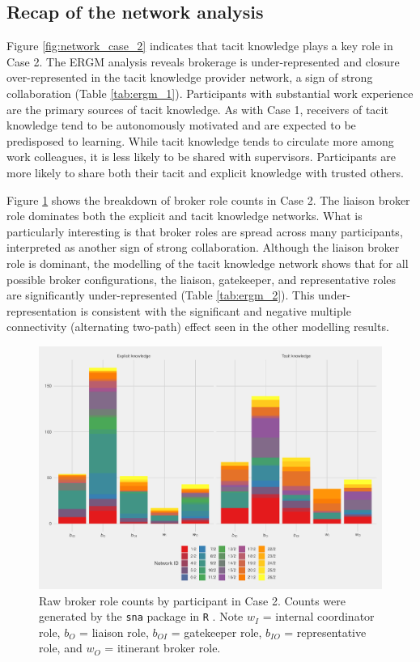 \subsection{Recap of the network analysis}

Figure \ref{fig:network_case_2} indicates that tacit knowledge plays a key role in Case 2. The ERGM analysis reveals brokerage is under-represented and closure over-represented in the tacit knowledge provider network, a sign of strong collaboration (Table \ref{tab:ergm_1}). Participants with substantial work experience are the primary sources of tacit knowledge. As with Case 1, receivers of tacit knowledge tend to be autonomously motivated and are expected to be predisposed to learning. While tacit knowledge tends to circulate more among work colleagues, it is less likely to be shared with supervisors. Participants are more likely to share both their tacit and explicit knowledge with trusted others. \medskip

Figure \ref{fig:gf_c2} shows the breakdown of broker role counts in Case 2. The liaison broker role dominates both the explicit and tacit knowledge networks. What is particularly interesting is that broker roles are spread across many participants, interpreted as another sign of strong collaboration. Although the liaison broker role is dominant, the modelling of the tacit knowledge network shows that for all possible broker configurations, the liaison, gatekeeper, and representative roles are significantly under-represented (Table \ref{tab:ergm_2}). This under-representation is consistent with the significant and negative multiple connectivity (alternating two-path) effect seen in the other modelling results.

\begin{figure}[hbt!]
\centering
\includegraphics[width = \textwidth]{Images/gf_case2.pdf}
\caption[Raw broker role counts by participant in Case 2]{Raw broker role counts by participant in Case 2. Counts were generated by the \texttt{sna} package in \texttt{R} \citep{butts2016sna}. Note $w_I$ = internal coordinator role, $b_O$ = liaison role, $b_{OI}$ = gatekeeper role, $b_{IO}$ = representative role, and $w_O$ = itinerant broker role.}
\label{fig:gf_c2}
\end{figure}

